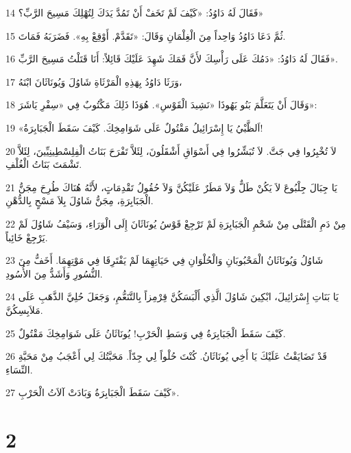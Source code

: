 \par 14 فَقَالَ لَهُ دَاوُدُ: «كَيْفَ لَمْ تَخَفْ أَنْ تَمُدَّ يَدَكَ لِتُهْلِكَ مَسِيحَ الرَّبِّ؟»
\par 15 ثُمَّ دَعَا دَاوُدُ وَاحِداً مِنَ الْغِلْمَانِ وَقَالَ: «تَقَدَّمْ. أَوْقِعْ بِهِ». فَضَرَبَهُ فَمَاتَ.
\par 16 فَقَالَ لَهُ دَاوُدُ: «دَمُكَ عَلَى رَأْسِكَ لأَنَّ فَمَكَ شَهِدَ عَلَيْكَ قَائِلاً: أَنَا قَتَلْتُ مَسِيحَ الرَّبِّ».
\par 17 وَرَثَا دَاوُدُ بِهَذِهِ الْمَرْثَاةِ شَاوُلَ وَيُونَاثَانَ ابْنَهُ،
\par 18 وَقَالَ أَنْ يَتَعَلَّمَ بَنُو يَهُوذَا «نَشِيدَ الْقَوْسِ». هُوَذَا ذَلِكَ مَكْتُوبٌ فِي «سِفْرِ يَاشَرَ»:
\par 19 «اَلظَّبْيُ يَا إِسْرَائِيلُ مَقْتُولٌ عَلَى شَوَامِخِكَ. كَيْفَ سَقَطَ الْجَبَابِرَةُ!
\par 20 لاَ تُخْبِرُوا فِي جَتَّ. لاَ تُبَشِّرُوا فِي أَسْوَاقِ أَشْقَلُونَ، لِئَلاَّ تَفْرَحَ بَنَاتُ الْفِلِسْطِينِيِّينَ، لِئَلاَّ تَشْمَتَ بَنَاتُ الْغُلْفِ.
\par 21 يَا جِبَالَ جِلْبُوعَ لاَ يَكُنْ طَلٌّ وَلاَ مَطَرٌ عَلَيْكُنَّ وَلاَ حُقُولُ تَقْدِمَاتٍ، لأَنَّهُ هُنَاكَ طُرِحَ مِجَنُّ الْجَبَابِرَةِ، مِجَنُّ شَاوُلَ بِلاَ مَسْحٍ بِالدُّهْنِ.
\par 22 مِنْ دَمِ الْقَتْلَى مِنْ شَحْمِ الْجَبَابِرَةِ لَمْ تَرْجِعْ قَوْسُ يُونَاثَانَ إِلَى الْوَرَاءِ، وَسَيْفُ شَاوُلَ لَمْ يَرْجِعْ خَائِباً.
\par 23 شَاوُلُ وَيُونَاثَانُ الْمَحْبُوبَانِ وَالْحُلْوَانِ فِي حَيَاتِهِمَا لَمْ يَفْتَرِقَا فِي مَوْتِهِمَا. أَخَفُّ مِنَ النُّسُورِ وَأَشَدُّ مِنَ الأُسُودِ.
\par 24 يَا بَنَاتِ إِسْرَائِيلَ، ابْكِينَ شَاوُلَ الَّذِي أَلْبَسَكُنَّ قِرْمِزاً بِالتَّنَعُّمِ، وَجَعَلَ حُلِيَّ الذَّهَبِ عَلَى مَلاَبِسِكُنَّ.
\par 25 كَيْفَ سَقَطَ الْجَبَابِرَةُ فِي وَسَطِ الْحَرْبِ! يُونَاثَانُ عَلَى شَوَامِخِكَ مَقْتُولٌ.
\par 26 قَدْ تَضَايَقْتُ عَلَيْكَ يَا أَخِي يُونَاثَانُ. كُنْتَ حُلْواً لِي جِدّاً. مَحَبَّتُكَ لِي أَعْجَبُ مِنْ مَحَبَّةِ النِّسَاءِ.
\par 27 كَيْفَ سَقَطَ الْجَبَابِرَةُ وَبَادَتْ آلاَتُ الْحَرْبِ».

\chapter{2}

